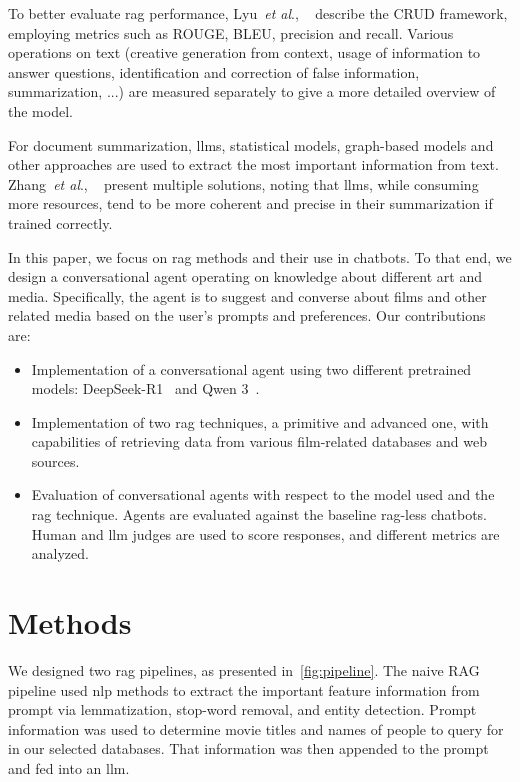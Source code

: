 \documentclass[fleqn,moreauthors,10pt]{ds_report}
\newcommand{\etal}{\textit{et al}., }
\begin{document}
To better evaluate \ac{rag} performance, Lyu~\etal~\cite{benchmark} describe the CRUD framework, employing metrics such as ROUGE, BLEU, precision and recall. Various operations on text (creative generation from context, usage of information to answer questions, identification and correction of false information, summarization, ...) are measured separately to give a more detailed overview of the model. 

For document summarization, \acp{llm}, statistical models, graph-based models and other approaches are used to extract the most important information from text. Zhang~\etal~\cite{summarization} present multiple solutions, noting that \acp{llm}, while consuming more resources, tend to be more coherent and precise in their summarization if trained correctly.

In this paper, we focus on \ac{rag} methods and their use in chatbots. To that end, we design a conversational agent operating on knowledge about different art and media. Specifically, the agent is to suggest and converse about films and other related media based on the user’s prompts and preferences. Our contributions are:

\begin{itemize}
	\item Implementation of a conversational agent using two different pretrained models: DeepSeek-R1~\cite{deepseek3} and Qwen 3~\cite{qwen3}.
	\item Implementation of two \ac{rag} techniques, a primitive and advanced one, with capabilities of retrieving data from various film-related databases and web sources.
	\item Evaluation of conversational agents with respect to the model used and the \ac{rag} technique. Agents are evaluated against the baseline \ac{rag}-less chatbots. Human and \ac{llm} judges are used to score responses, and different metrics are analyzed.
\end{itemize}


\section*{Methods}

We designed two \ac{rag} pipelines, as presented in~\cref{fig:pipeline}. The naive RAG pipeline used \ac{nlp} methods to extract the important feature information from prompt via lemmatization, stop-word removal, and entity detection. Prompt information was used to determine movie titles and names of people to query for in our selected databases. That information was then appended to the prompt and fed into an \ac{llm}.
\end{document}
